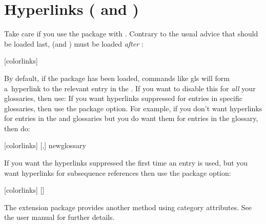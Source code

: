 \documentclass[titlepage=false,oneside,
 fontsize=12pt,captions=tableheading]{scrarticle}
\begin{document}
\section{Hyperlinks ( and )}
\label{sec:hyperref}

Take care if you use the  package with
. Contrary to the usual advice that 
should be loaded last,  (and ) 
must be loaded \emph{after} :
\begin{codebox}
[colorlinks]
\end{codebox}

By default, if the  package has been loaded, commands
like \gls{gls} will form a~hyperlink to the relevant entry in the
. If you want to disable this for \emph{all} your
glossaries, then use:
If you want hyperlinks suppressed for entries in specific
glossaries, then use the  package option. For
example, if you don't want hyperlinks for entries in the  and
 glossaries but you do want them for entries in the
 glossary, then do:
\begin{codebox}
[colorlinks]
[,]
\gls{newglossary}
\end{codebox}

If you want the hyperlinks suppressed the first time an entry is
used, but you want hyperlinks for subsequence references then use
the  package option:
\begin{codebox}
[colorlinks]
[]
\end{codebox}
The  extension package provides another method
using category attributes. See the  user
manual for further details.
\end{document}
